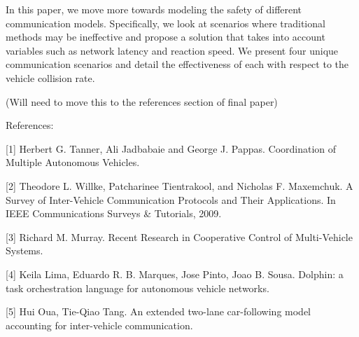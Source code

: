 In this paper, we move more towards modeling the safety of different communication models.
Specifically, we look at scenarios where traditional methods may be ineffective and propose
a solution that takes into account variables such as network latency and reaction speed.
We present four unique communication scenarios and detail the effectiveness of each
with respect to the vehicle collision rate.


(Will need to move this to the references section of final paper)

References:

[1] Herbert G. Tanner, Ali Jadbabaie and George J. Pappas. Coordination of Multiple Autonomous Vehicles.

[2] Theodore L. Willke, Patcharinee Tientrakool, and Nicholas F. Maxemchuk. A Survey of Inter-Vehicle Communication Protocols and Their Applications. In IEEE Communications Surveys & Tutorials, 2009.

[3] Richard M. Murray. Recent Research in Cooperative Control of Multi-Vehicle Systems.

[4] Keila Lima, Eduardo R. B. Marques, Jose Pinto, Joao B. Sousa. Dolphin: a task orchestration language for autonomous vehicle networks.

[5] Hui Oua, Tie-Qiao Tang. An extended two-lane car-following model accounting for inter-vehicle communication.
